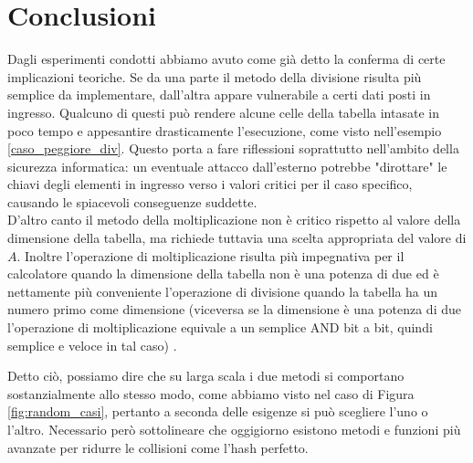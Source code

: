 \newpage
\section{Conclusioni}

Dagli esperimenti condotti abbiamo avuto come già detto la conferma di certe implicazioni teoriche. Se da una parte il metodo della divisione risulta più semplice da implementare, dall'altra appare vulnerabile a certi dati posti in ingresso. Qualcuno di questi può rendere alcune celle della tabella intasate in poco tempo e appesantire drasticamente l'esecuzione, come visto nell'esempio \ref{caso_peggiore_div}. Questo porta a fare riflessioni soprattutto nell'ambito della sicurezza informatica: un eventuale attacco dall'esterno potrebbe "dirottare" le chiavi degli elementi in ingresso verso i valori critici per il caso specifico, causando le spiacevoli conseguenze suddette. 
\\ D'altro canto il metodo della moltiplicazione non è critico rispetto al valore della dimensione della tabella, ma richiede tuttavia una scelta appropriata del valore di $A$. Inoltre l'operazione di moltiplicazione risulta più impegnativa per il calcolatore quando la dimensione della tabella non è una potenza di due ed è nettamente più conveniente l'operazione di divisione quando la tabella ha un numero primo come dimensione (viceversa se la dimensione è una potenza di due l'operazione di moltiplicazione equivale a un semplice AND bit a bit, quindi semplice e veloce in tal caso) \cite{Stack}.

Detto ciò, possiamo dire che su larga scala i due metodi si comportano sostanzialmente allo stesso modo, come abbiamo visto nel caso di Figura \ref{fig:random_casi}, pertanto a seconda delle esigenze si può scegliere l'uno o l'altro. Necessario però sottolineare che oggigiorno esistono metodi e funzioni più avanzate per ridurre le collisioni come l'hash perfetto.